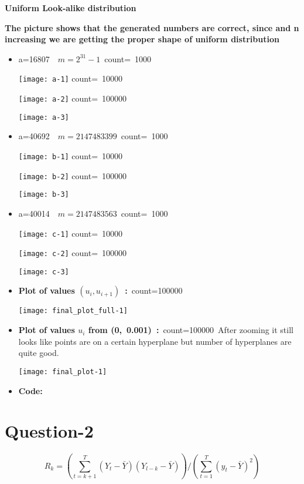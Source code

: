\documentclass{article}
\begin{document}
\item \textbf{Uniform Look-alike distribution}
\item \textbf{The picture shows that the generated numbers are correct, since and n increasing we are getting
the proper shape of uniform distribution}
\begin{itemize}
\item a=16807\ \ \(m=2^{31}-1\)\
count=\ 1000


\texttt{[image: a-1]}
count=\ 10000


\texttt{[image: a-2]}
count=\ 100000


\texttt{[image: a-3]}
\item a=40692\ \ \(m=2147483399\)\
count=\ 1000


\texttt{[image: b-1]}
count=\ 10000


\texttt{[image: b-2]}
count=\ 100000


\texttt{[image: b-3]}
\item a=40014\ \ \(m=2147483563\)\
count=\ 1000


\texttt{[image: c-1]}
count=\ 10000


\texttt{[image: c-2]}
count=\ 100000


\texttt{[image: c-3]}

\item \textbf{Plot of values \((u_i,u_{i+1})\)\ :}\
count=100000

\texttt{[image: final\_plot\_full-1]}

\item \textbf{Plot of values \(u_i\) from (0,\ 0.001)\ :}\
count=100000\
After zooming it still looks like points are on a certain hyperplane but number of hyperplanes are quite good.

\texttt{[image: final\_plot-1]}

\item \textbf{Code: }\



\end{itemize}
\vspace{5mm}

\section{Question-2}


\[R_k=(\sum_{t=k+1}^{T} (Y_t-\bar{Y})(Y_{l-k}-\bar{Y}))/(\sum_{t=1}^{T} (y_t-\bar{Y})^{2})\]
\end{document}
